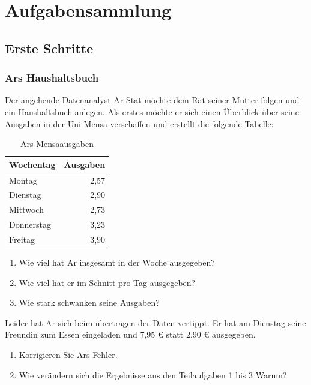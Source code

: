 \documentclass[]{book}
\providecommand{\tightlist}{%
  \setlength{\itemsep}{0pt}\setlength{\parskip}{0pt}}
\begin{document}
\hypertarget{aufgabensammlung}{%
\chapter{Aufgabensammlung}\label{aufgabensammlung}}

\hypertarget{erste-schritte}{%
\section{Erste Schritte}\label{erste-schritte}}

\hypertarget{ars-haushaltsbuch}{%
\subsection{Ars Haushaltsbuch}\label{ars-haushaltsbuch}}

Der angehende Datenanalyst Ar Stat möchte dem Rat seiner Mutter folgen und ein Haushaltsbuch anlegen. Als erstes möchte er sich einen Überblick über seine Ausgaben in der Uni-Mensa verschaffen und erstellt die folgende Tabelle:

\begin{table}

\caption{\label{tab:unnamed-chunk-31}Ars Mensaausgaben}
\centering
\begin{tabular}[t]{lr}
\toprule
Wochentag & Ausgaben\\
\midrule
Montag & 2,57\\
Dienstag & 2,90\\
Mittwoch & 2,73\\
Donnerstag & 3,23\\
Freitag & 3,90\\
\bottomrule
\end{tabular}
\end{table}

\begin{enumerate}
\def\labelenumi{\arabic{enumi}.}
\tightlist
\item
  Wie viel hat Ar insgesamt in der Woche ausgegeben?
\item
  Wie viel hat er im Schnitt pro Tag ausgegeben?
\item
  Wie stark schwanken seine Ausgaben?
\end{enumerate}

Leider hat Ar sich beim übertragen der Daten vertippt. Er hat am Dienstag seine Freundin zum Essen eingeladen und 7,95 € statt 2,90 € ausgegeben.

\begin{enumerate}
\def\labelenumi{\arabic{enumi}.}
\setcounter{enumi}{3}
\tightlist
\item
  Korrigieren Sie Ars Fehler.
\item
  Wie verändern sich die Ergebnisse aus den Teilaufgaben 1 bis 3 Warum?
\end{enumerate}
\end{document}
